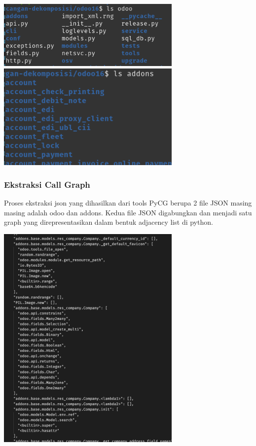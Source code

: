 \begin{center}
	\includegraphics[width=9cm]{img/bab_3/lsOdoo.png}
	\includegraphics[width=9cm]{img/bab_3/lsAddons.png}
	\label{fig:asd}
\end{center}

\subsubsection{Ekstraksi Call Graph}
Proses ekstraksi json yang dihasilkan dari tools PyCG berupa 2 file JSON masing masing adalah odoo dan addons. Kedua file JSON digabungkan dan menjadi satu graph yang direpresentasikan dalam bentuk adjacency list di python.
\begin{center}
	\includegraphics[width=9cm]{img/bab_3/JSONPyCG.png}
	\label{fig:asd}
\end{center}
